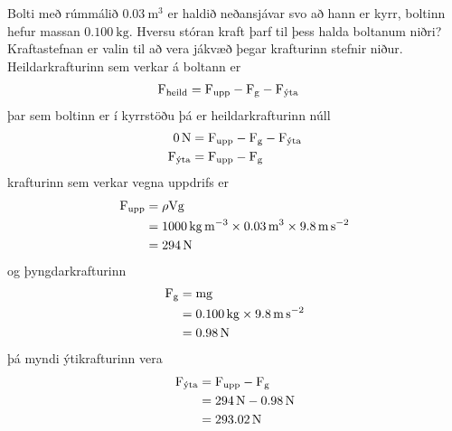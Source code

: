 \begin{formalexample}
Bolti með rúmmálið $\SI{0.03}{\m\cubed}$ er haldið neðansjávar svo að hann er
kyrr, boltinn hefur massan $\SI{0.100}{\kg}$. Hversu stóran kraft þarf til þess
halda boltanum niðri?
\\[4 ex]
Kraftastefnan er valin til að vera jákvæð þegar krafturinn stefnir niður.
Heildarkrafturinn sem verkar á boltann er
\begin{align*}
	\textrm{F}_\text{heild} &= \textrm{F}_\text{upp} -\textrm{F}_\text{g} 
		- \textrm{F}_\text{ýta}
\end{align*}
þar sem boltinn er í kyrrstöðu þá er heildarkrafturinn núll
\begin{align*}
	\SI{0}{\N} &= \uforce_\text{upp} -\uforce_\text{g} 
		- \uforce_\text{ýta} \\
	\uforce_\text{ýta} &= \uforce_\text{upp} - \uforce_\text{g}
\end{align*}
krafturinn sem verkar vegna uppdrifs er
\begin{align*}
	\uforce_\text{upp} &= \rho \uvolume \uacceleg \\
		&= \SI{1000}{\kg\per\m\cubed} \times \SI{0.03}{\m\cubed}
			\times \SI{9.8}{\m\per\s\squared} \\
		&= \SI{294}{\N}
\end{align*}
og þyngdarkrafturinn
\begin{align*}
	\uforce_\text{g} &= \umass \uacceleg \\
		&= \SI{0.100}{\kg} \times \SI{9.8}{\m\per\s\squared} \\
		&= \SI{0.98}{\N}
\end{align*}
þá myndi ýtikrafturinn vera
\begin{align*}
	\uforce_\text{ýta} &= \uforce_\text{upp} - \uforce_\text{g} \\
		&= \SI{294}{\N} - \SI{0.98}{\N} \\
		&= \SI{293.02}{\N}
\end{align*}

\end{formalexample}
